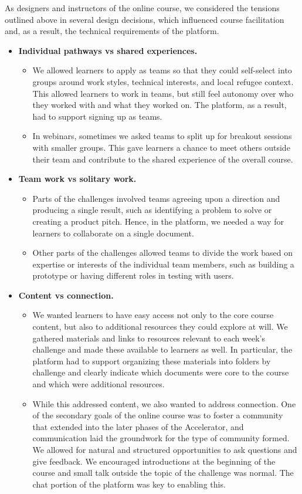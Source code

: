 \documentclass[12pt,twoside]{mitthesis}
\newcommand{\draft}[1]{{\color{blue} #1}}
\begin{document}
\draft{As designers and instructors of the online course, we considered the tensions outlined above in several design decisions, which influenced course facilitation and, as a result, the technical requirements of the platform.

\begin{itemize}
\item \textbf{Individual pathways vs shared experiences.}
\begin{itemize}
	\item We allowed learners to apply as teams so that they could self-select into groups around work styles, technical interests, and local refugee context. This allowed learners to work in teams, but still feel autonomy over who they worked with and what they worked on. The platform, as a result, had to support signing up as teams.
	\item In webinars, sometimes we asked teams to split up for breakout sessions with smaller groups. This gave learners a chance to meet others outside their team and contribute to the shared experience of the overall course.
\end{itemize}
\item \textbf{Team work vs solitary work.}
\begin{itemize}
	\item Parts of the challenges involved teams agreeing upon a direction and producing a single result, such as identifying a problem to solve or creating a product pitch. Hence, in the platform, we needed a way for learners to collaborate on a single document.
	\item Other parts of the challenges allowed teams to divide the work based on expertise or interests of the individual team members, such as building a prototype or having different roles in testing with users.
\end{itemize}
\item \textbf{Content vs connection.} 
\begin{itemize}
	\item We wanted learners to have easy access not only to the core course content, but also to additional resources they could explore at will. We gathered materials and links to resources relevant to each week's challenge and made these available to learners as well. In particular, the platform had to support organizing these materials into folders by challenge and clearly indicate which documents were core to the course and which were additional resources.
	\item While this addressed content, we also wanted to address connection. One of the secondary goals of the online course was to foster a community that extended into the later phases of the Accelerator, and communication laid the groundwork for the type of community formed. We allowed for natural and structured opportunities to ask questions and give feedback. We encouraged introductions at the beginning of the course and small talk outside the topic of the challenge was normal. The chat portion of the platform was key to enabling this.
\end{itemize}
\end{itemize}

}
\end{document}
